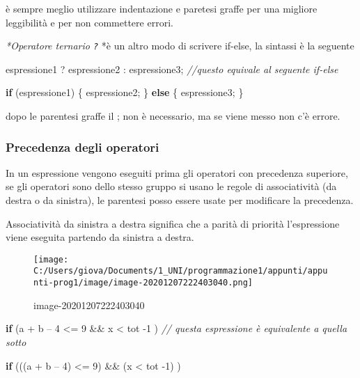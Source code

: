 \documentclass[
]{article}
\newenvironment{Shaded}{}{}
\newcommand{\CommentTok}[1]{\textcolor[rgb]{0.38,0.63,0.69}{\textit{#1}}}
\newcommand{\ControlFlowTok}[1]{\textcolor[rgb]{0.00,0.44,0.13}{\textbf{#1}}}
\newcommand{\DecValTok}[1]{\textcolor[rgb]{0.25,0.63,0.44}{#1}}
\newcommand{\NormalTok}[1]{#1}
\begin{document}
è sempre meglio utilizzare indentazione e paretesi graffe per una
migliore leggibilità e per non commettere errori.

\emph{*Operatore ternario \texttt{?}} *è un altro modo di scrivere
if-else, la sintassi è la seguente

\begin{Shaded}
\begin{Highlighting}[]
\NormalTok{espressione1 ? espressione2 : espressione3; }\CommentTok{//questo equivale al seguente if{-}else}

\ControlFlowTok{if}\NormalTok{ (espressione1)}
\NormalTok{	\{ espressione2; \}}
\ControlFlowTok{else}
\NormalTok{	\{ espressione3; \}}
\end{Highlighting}
\end{Shaded}

dopo le parentesi graffe il ; non è necessario, ma se viene messo non
c'è errore.

\hypertarget{header-n380}{%
\subsubsection{Precedenza degli operatori}\label{header-n380}}

In un espressione vengono eseguiti prima gli operatori con precedenza
superiore, se gli operatori sono dello stesso gruppo si usano le regole
di associatività (da destra o da sinistra), le parentesi posso essere
usate per modificare la precedenza.

Associatività da sinistra a destra significa che a parità di priorità
l'espressione viene eseguita partendo da sinistra a destra.

\begin{figure}
\centering
\texttt{[image: C:/Users/giova/Documents/1\_UNI/programmazione1/appunti/appunti-prog1/image/image-20201207222403040.png]}
\caption{image-20201207222403040}
\end{figure}

\begin{Shaded}
\begin{Highlighting}[]
\ControlFlowTok{if}\NormalTok{ (a + b – }\DecValTok{4}\NormalTok{ \textless{}= }\DecValTok{9}\NormalTok{ \&\& x \textless{} tot {-}}\DecValTok{1}\NormalTok{ ) }\CommentTok{// questa espressione è equivalente a quella sotto}
    
\ControlFlowTok{if}\NormalTok{ (((a + b – }\DecValTok{4}\NormalTok{) \textless{}= }\DecValTok{9}\NormalTok{) \&\& (x \textless{} tot {-}}\DecValTok{1}\NormalTok{) )}
\end{Highlighting}
\end{Shaded}
\end{document}
